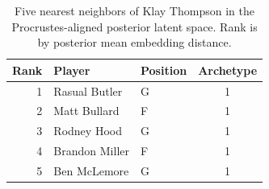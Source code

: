 \begin{table}[htbp]
  \centering\small
  \begin{tabular}{rllc}
    \toprule
    Rank & Player & Position & Archetype \\
    \midrule
    1 & Rasual Butler & G & 1 \\
    2 & Matt Bullard & F & 1 \\
    3 & Rodney Hood & G & 1 \\
    4 & Brandon Miller & F & 1 \\
    5 & Ben McLemore & G & 1 \\
    \bottomrule
  \end{tabular}
  \caption{Five nearest neighbors of Klay Thompson in the Procrustes-aligned posterior latent space. Rank is by posterior mean embedding distance.}
  \label{tab:Klay_Thompson_neighbors}
\end{table}

